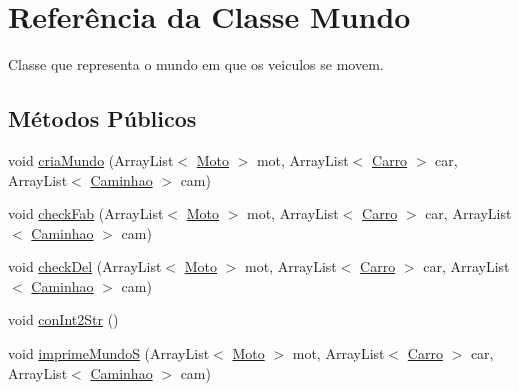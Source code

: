 \hypertarget{class_mundo}{}\section{Referência da Classe Mundo}
\label{class_mundo}


Classe que representa o mundo em que os veiculos se movem.  


\subsection*{Métodos Públicos}
\begin{DoxyCompactItemize}
\item 
void \mbox{\hyperlink{class_mundo_a89da5526d6fa79801cfa48b587aa8343}{cria\+Mundo}} (Array\+List$<$ \mbox{\hyperlink{class_moto}{Moto}} $>$ mot, Array\+List$<$ \mbox{\hyperlink{class_carro}{Carro}} $>$ car, Array\+List$<$ \mbox{\hyperlink{class_caminhao}{Caminhao}} $>$ cam)
\item 
void \mbox{\hyperlink{class_mundo_aaf8ab7632e91cf6b92d8beb031858de1}{check\+Fab}} (Array\+List$<$ \mbox{\hyperlink{class_moto}{Moto}} $>$ mot, Array\+List$<$ \mbox{\hyperlink{class_carro}{Carro}} $>$ car, Array\+List$<$ \mbox{\hyperlink{class_caminhao}{Caminhao}} $>$ cam)
\item 
void \mbox{\hyperlink{class_mundo_a0317827fd7dc86705d5ad3fb86d61741}{check\+Del}} (Array\+List$<$ \mbox{\hyperlink{class_moto}{Moto}} $>$ mot, Array\+List$<$ \mbox{\hyperlink{class_carro}{Carro}} $>$ car, Array\+List$<$ \mbox{\hyperlink{class_caminhao}{Caminhao}} $>$ cam)
\item 
void \mbox{\hyperlink{class_mundo_a7c0f57fc41e5712a905bc836c9d1f9c5}{con\+Int2\+Str}} ()
\item 
void \mbox{\hyperlink{class_mundo_a52455726daee2575ad03b11441fea89e}{imprime\+MundoS}} (Array\+List$<$ \mbox{\hyperlink{class_moto}{Moto}} $>$ mot, Array\+List$<$ \mbox{\hyperlink{class_carro}{Carro}} $>$ car, Array\+List$<$ \mbox{\hyperlink{class_caminhao}{Caminhao}} $>$ cam)
\end{DoxyCompactItemize}
